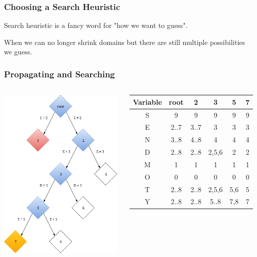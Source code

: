 \begin{frame}
	\frametitle{Choosing a Search Heuristic}
	Search heuristic is a fancy word for "how we want to guess".
	
	\vspace{1cm}

	When we can no longer shrink domains but there are still multiple possibilities we guess.
\end{frame}

\begin{frame}
	\frametitle{Propagating and Searching}
	\begin{columns}
		\begin{column}{0.5\textwidth}
			\includegraphics[width=6cm]{../background/constraint-programming/figures/constraint_first_solution}
		\end{column}

		\tabcolsep=0.11cm
		\begin{column}{0.5\textwidth}
			\begin{tabular}{c|c|c|c|c|c}
				Variable & root & 2 & 3 & 5 & 7 \\
				\hline
				S & 9 & 9 & 9 & 9 & 9 \\
				E & 2..7 & 3..7 & 3 & 3 & 3 \\
				N & 3..8 & 4..8 & 4 & 4 & 4 \\
				D & 2..8 & 2..8 & 2,5,6 & 2 & 2 \\
				M & 1 & 1 & 1 & 1 & 1 \\
				O & 0 & 0 & 0 & 0 & 0 \\
				T & 2..8 & 2..8 & 2,5,6 & 5,6 & 5 \\
				Y & 2..8 & 2..8 & 5..8 & 7,8 & 7 \\
			\end{tabular}

		\end{column}
	\end{columns}
\end{frame}

